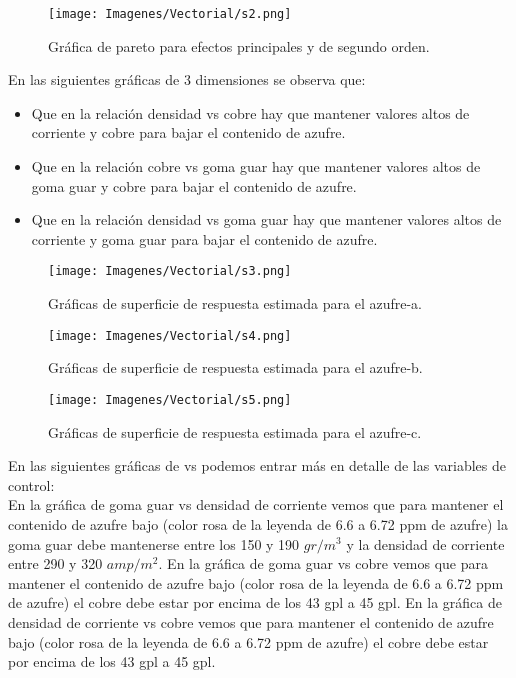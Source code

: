 \begin{figure}[H]
 \centering
 \texttt{[image: Imagenes/Vectorial/s2.png]}
 \caption{Gr\'afica de pareto para efectos principales y de segundo orden.}
 \label{fig:s2}
\end{figure}

En las siguientes gr\'aficas de 3 dimensiones se observa que:
\begin{itemize}
 \item Que en la relaci\'on densidad vs cobre hay que mantener valores altos de corriente y cobre para bajar el contenido de azufre.
 \item Que en la relaci\'on cobre vs goma guar hay que mantener valores altos de goma guar y cobre para bajar el contenido de azufre.
 \item Que en la relaci\'on densidad vs goma guar hay que mantener valores altos de corriente y goma guar para bajar el contenido de azufre.
\end{itemize}

\begin{figure}[H]
 \centering
 \texttt{[image: Imagenes/Vectorial/s3.png]}
 \caption{Gr\'aficas de superficie de respuesta estimada para el azufre-a.}
 \label{fig:s3}
\end{figure}

\begin{figure}[H]
 \centering
 \texttt{[image: Imagenes/Vectorial/s4.png]}
 \caption{Gr\'aficas de superficie de respuesta estimada para el azufre-b.}
 \label{fig:s4}
\end{figure}

\begin{figure}[H]
 \centering
 \texttt{[image: Imagenes/Vectorial/s5.png]}
 \caption{Gr\'aficas de superficie de respuesta estimada para el azufre-c.}
 \label{fig:s5}
\end{figure}

En las siguientes gr\'aficas de vs podemos entrar m\'as en detalle de las variables de control:\\

En la gr\'afica de goma guar vs densidad de corriente vemos que para mantener el contenido de azufre bajo (color rosa de la leyenda de 6.6 a 6.72 ppm de azufre) la goma guar debe mantenerse entre los 150 y 190 $gr/m^3$ y la densidad de corriente entre 290 y 320 $amp/m^2$.
En la gr\'afica de goma guar vs cobre vemos que para mantener el contenido de azufre bajo (color rosa de la leyenda de 6.6 a 6.72 ppm de azufre) el cobre debe estar por encima de los 43 gpl a 45 gpl.
En la gr\'afica de densidad de corriente vs cobre vemos que para mantener el contenido de azufre bajo (color rosa de la leyenda de 6.6 a 6.72 ppm de azufre) el cobre debe estar por encima de los 43 gpl a 45 gpl.

